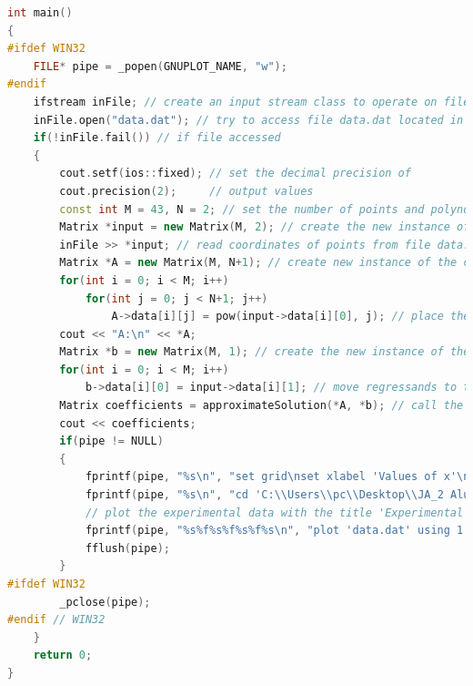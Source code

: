 \documentclass[11pt]{article}
\begin{document}
\begin{lstlisting}[language=C++, caption=Implementation of Least-squares approximation algorithm]
int main()
{
#ifdef WIN32
    FILE* pipe = _popen(GNUPLOT_NAME, "w");
#endif
    ifstream inFile; // create an input stream class to operate on files
    inFile.open("data.dat"); // try to access file data.dat located in the same directory
    if(!inFile.fail()) // if file accessed
    {
        cout.setf(ios::fixed); // set the decimal precision of
        cout.precision(2);     // output values
        const int M = 43, N = 2; // set the number of points and polynomial degree for an approximation
        Matrix *input = new Matrix(M, 2); // create the new instance of class Matrix to store experimental data (the cloud of points)
        inFile >> *input; // read coordinates of points from file data.dat
        Matrix *A = new Matrix(M, N+1); // create new instance of the class Matrix to store regressors
        for(int i = 0; i < M; i++)
            for(int j = 0; j < N+1; j++)
                A->data[i][j] = pow(input->data[i][0], j); // place the j-th power of the x-coordinate of a corresponding i-th point in a matrix "A" with j <= N
        cout << "A:\n" << *A;
        Matrix *b = new Matrix(M, 1); // create the new instance of the class Matrix to store regressands
        for(int i = 0; i < M; i++)
            b->data[i][0] = input->data[i][1]; // move regressands to the created matrix "b"
        Matrix coefficients = approximateSolution(*A, *b); // call the function approximateSolution that calculates optimal coefficients for a parabolic function
        cout << coefficients;
        if(pipe != NULL)
        {
            fprintf(pipe, "%s\n", "set grid\nset xlabel 'Values of x'\nset ylabel 'Values of y'\n"); // set labels to axis of coordinates in space
            fprintf(pipe, "%s\n", "cd 'C:\\Users\\pc\\Desktop\\JA_2 Alukaev'"); // access the directory with the dataset
            // plot the experimental data with the title 'Experimental data' and parabolic approximation for it with the title 'Approximation'
            fprintf(pipe, "%s%f%s%f%s%f%s\n", "plot 'data.dat' using 1:2 title 'Experimental data' with points pointtype 5, ", coefficients.data[2][0], "*x**2+(", coefficients.data[1][0], ")*x+(", coefficients.data[0][0], ") title 'Approximation'");
            fflush(pipe);
        }
#ifdef WIN32
        _pclose(pipe);
#endif // WIN32
    }
    return 0;
}


\end{lstlisting}
\end{document}
